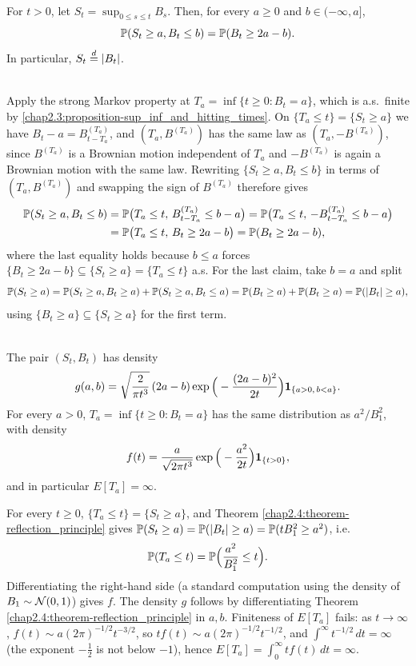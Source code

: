 \begin{theorem} \label{chap2.4:theorem-reflection_principle}  \\
For $t>0$, let $S_t=\sup_{0\le s\le t}B_s$. Then, for every $a\ge0$ and $b\in(-\infty,a]$,
$$\mathbb{P}(S_t\ge a, B_t\le b)=\mathbb{P}(B_t\ge 2a-b).$$
In particular, $S_t\overset{d}{=}|B_t|$.
\end{theorem}
\begin{proofidea}  \\
Apply the strong Markov property at $T_a=\inf\{t\ge0:B_t=a\}$, which is a.s.\ finite by \cref{chap2.3:proposition-sup_inf_and_hitting_times}. On $\{T_a\le t\}=\{S_t\ge a\}$ we have $B_t-a=B^{(T_a)}_{t-T_a}$, and $(T_a,B^{(T_a)})$ has the same law as $(T_a,-B^{(T_a)})$, since $B^{(T_a)}$ is a Brownian motion independent of $T_a$ and $-B^{(T_a)}$ is again a Brownian motion with the same law. Rewriting $\{S_t\ge a,B_t\le b\}$ in terms of $(T_a,B^{(T_a)})$ and swapping the sign of $B^{(T_a)}$ therefore gives
\begin{align*}
\mathbb{P}(S_t\ge a,B_t\le b) &=\mathbb{P}\big(T_a\le t,\, B^{(T_a)}_{t-T_a}\le b-a\big)=\mathbb{P}\big(T_a\le t,\,-B^{(T_a)}_{t-T_a}\le b-a\big) \\
&=\mathbb{P}\big(T_a\le t,\,B_t\ge 2a-b\big)=\mathbb{P}(B_t\ge2a-b),
\end{align*}
where the last equality holds because $b\le a$ forces $\{B_t\ge 2a-b\}\subseteq\{S_t\ge a\}=\{T_a\le t\}$ a.s. For the last claim, take $b=a$ and split
$$\mathbb{P}(S_t\ge a)=\mathbb{P}(S_t\ge a,B_t\ge a)+\mathbb{P}(S_t\ge a,B_t\le a)=\mathbb{P}(B_t\ge a)+\mathbb{P}(B_t\ge a)=\mathbb{P}(|B_t|\ge a),$$
using $\{B_t\ge a\}\subseteq\{S_t\ge a\}$ for the first term.
\end{proofidea}

\begin{corollary}[Law of $T_a$] \label{chap2.4:corollary-law_of_hitting_time}  \\
The pair $(S_t,B_t)$ has density
$$g(a,b)=\sqrt{\frac{2}{\pi t^3}}\,(2a-b)\exp\Big(-\frac{(2a-b)^2}{2t}\Big)\mathbf{1}_{\{a>0,\,b<a\}}.$$
For every $a>0$, $T_a=\inf\{t\ge0:B_t=a\}$ has the same distribution as $a^2/B_1^2$, with density
$$f(t)=\frac{a}{\sqrt{2\pi t^3}}\exp\Big(-\frac{a^2}{2t}\Big)\mathbf{1}_{\{t>0\}},$$
and in particular $E[T_a]=\infty$.
\end{corollary}
\begin{proofidea}
For every $t\ge0$, $\{T_a\le t\}=\{S_t\ge a\}$, and Theorem \ref{chap2.4:theorem-reflection_principle} gives $\mathbb{P}(S_t\ge a)=\mathbb{P}(|B_t|\ge a)=\mathbb{P}(tB_1^2\ge a^2)$, i.e.\
$$\mathbb{P}(T_a\le t)=\mathbb{P}\Big(\frac{a^2}{B_1^2}\le t\Big).$$
Differentiating the right-hand side (a standard computation using the density of $B_1\sim\mathcal{N}(0,1)$) gives $f$. The density $g$ follows by differentiating Theorem \ref{chap2.4:theorem-reflection_principle} in $a,b$. Finiteness of $E[T_a]$ fails: as $t\to\infty$, $f(t)\sim a(2\pi)^{-1/2}t^{-3/2}$, so $tf(t)\sim a(2\pi)^{-1/2}t^{-1/2}$, and $\int^\infty t^{-1/2}\,dt=\infty$ (the exponent $-\frac12$ is not below $-1$), hence $E[T_a]=\int_0^\infty tf(t)\,dt=\infty$.
\end{proofidea}

